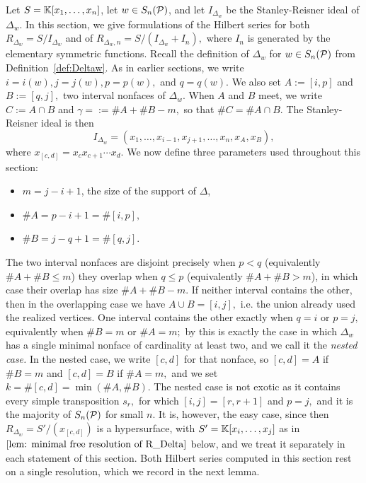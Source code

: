 Let $S = \mathbb{K}[x_1,\ldots,x_n]$, let $w\in S_n(\mathcal{P})$, and let $I_{\Delta_w}$ be the Stanley-Reisner ideal of $\Delta_w.$ 
In this section, we give formulations of the Hilbert series for both $R_{\Delta_w} = S/I_{\Delta_w}$ and of $R_{\Delta_w,n} = S/(I_{\Delta_w}+I_n),$ where $I_n$ is generated by the elementary symmetric functions.
Recall the definition of $\Delta_w$ for $w\in S_n(\mathcal{P})$ from Definition~\ref{def:Deltaw}. As in earlier sections, we write $i = i(w), j = j(w), p = p(w),$ and $q = q(w).$ We also set $A := [i,p]$ and $B := [q,j],$ two interval nonfaces of $\Delta_w.$
When $A$ and $B$ meet, we write $C := A\cap B$ and $\gamma = := \#A + \#B - m,$ so that $\#C = \#A\cap B.$
The Stanley-Reisner ideal is then
\[
I_{\Delta_w} = (x_1,\ldots,x_{i-1},x_{j+1},\ldots,x_n,x_{A},x_{B}),
\]
where $x_{[c,d]} = x_cx_{c+1}\cdots x_d.$
We now define three parameters used throughout this section:
\begin{itemize}
    \item $m = j - i + 1$, the size of the support of $\Delta$,
    \item $\#A = p - i + 1 = \#[i,p],$
    \item $\#B = j - q + 1 = \#[q,j].$
\end{itemize}
The two interval nonfaces are disjoint precisely when $p < q$ (equivalently $\#A + \#B \leq m$) they overlap when $q \leq p$ (equivalently $\#A + \#B > m$), in which case their overlap has size $\#A + \#B - m.$ 
If neither interval contains the other, then in the overlapping case we have $A\cup B = [i,j],$ i.e. the union already used the realized vertices. One interval contains the other exactly when $q = i$ or $p = j,$ equivalently when $\#B = m$ or $\#A = m;$ by  this is exactly the case in which $\Delta_w$ has a single minimal nonface of cardinality at least two, and we call it the \emph{nested case.} In the nested case, we write $[c,d]$ for that nonface, so $[c,d] = A$ if $\#B = m$ and $[c,d] = B$ if $\#A = m,$ and we set $k = \#[c,d] = \min(\#A,\#B).$ The nested case is not exotic as it contains every simple transposition $s_r,$ for which $[i,j] = [r,r+1]$ and $p = j,$ and it is the majority of $S_n(\mathcal{P})$ for small $n.$ It is, however, the easy case, since then $R_{\Delta_w} = S'/(x_{[c,d]})$ is a hypersurface, with $S' = \mathbb{K}[x_i,\ldots,x_j]$ as in $\Cref{lem: minimal free resolution of R_Delta}$ below, and we treat it separately in each statement of this section. Both Hilbert series computed in this section rest on a single resolution, which we record in the next lemma.
